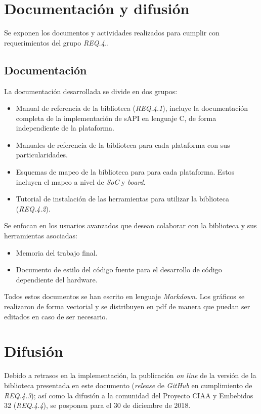 \newpage 
\section{Documentación y difusión}
\label{sec:documentation}

Se exponen los documentos y actividades realizados para cumplir con requerimientos del grupo \emph{REQ.4.}.

\subsection{Documentación}

La documentación desarrollada se divide en dos grupos:


\begin{itemize}
\item
Manual de referencia de la biblioteca (\emph{REQ.4.1}), incluye la documentación completa de la implementación de sAPI en lenguaje C, de forma independiente de la plataforma.
\item
Manuales de referencia de la biblioteca para cada plataforma con sus particularidades.
\item
Esquemas de mapeo de la biblioteca para para cada plataforma. Estos incluyen el mapeo a nivel de \emph{SoC} y \emph{board}.
\item
Tutorial de instalación de las herramientas para utilizar la biblioteca (\emph{REQ.4.2}).
\end{itemize}


Se enfocan en los usuarios avanzados que desean colaborar con la biblioteca y sus herramientas asociadas:

\begin{itemize}
\item
Memoria del trabajo final.
\item
Documento de estilo del código fuente para el desarrollo de código dependiente del hardware.
\end{itemize}

Todos estos documentos se han escrito en lenguaje \emph{Markdown}. Los gráficos se realizaron de forma vectorial y se distribuyen en pdf de manera que puedan ser editados en caso de ser necesario. 

\section{Difusión}

Debido a retrasos en la implementación, la publicación \emph{on line} de la versión de la biblioteca presentada en este documento (\emph{release} de \emph{GitHub} en cumplimiento de \emph{REQ.4.3}); así como la difusión a la comunidad del Proyecto CIAA y Embebidos 32 (\emph{REQ.4.4}), se posponen para el 30 de diciembre de 2018.
